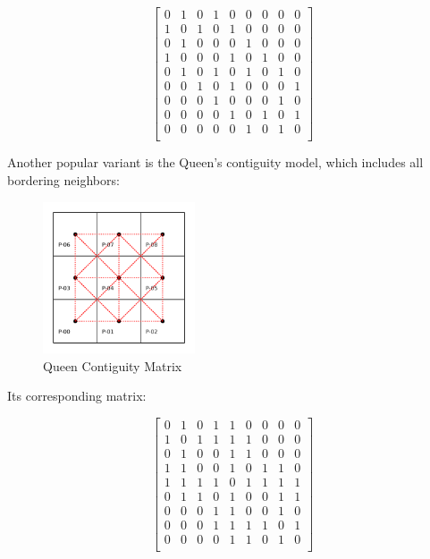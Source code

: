\documentclass{article}
\begin{document}
\[
	\begin{bmatrix}
		0 & 1 & 0 & 1 & 0 & 0 & 0 & 0 & 0 \\
		1 & 0 & 1 & 0 & 1 & 0 & 0 & 0 & 0 \\
		0 & 1 & 0 & 0 & 0 & 1 & 0 & 0 & 0 \\
		1 & 0 & 0 & 0 & 1 & 0 & 1 & 0 & 0 \\
		0 & 1 & 0 & 1 & 0 & 1 & 0 & 1 & 0 \\
		0 & 0 & 1 & 0 & 1 & 0 & 0 & 0 & 1 \\
		0 & 0 & 0 & 1 & 0 & 0 & 0 & 1 & 0 \\
		0 & 0 & 0 & 0 & 1 & 0 & 1 & 0 & 1 \\
		0 & 0 & 0 & 0 & 0 & 1 & 0 & 1 & 0 \\
	\end{bmatrix}
\]

Another popular variant is the Queen’s contiguity model, which includes all bordering neighbors:

\begin{figure}[H]
	\centering
	\includegraphics[width=0.4\textwidth]{assets/queens.png}
	\caption{Queen Contiguity Matrix}
\end{figure}

Its corresponding matrix:

\[
	\begin{bmatrix}
		0 & 1 & 0 & 1 & 1 & 0 & 0 & 0 & 0 \\
		1 & 0 & 1 & 1 & 1 & 1 & 0 & 0 & 0 \\
		0 & 1 & 0 & 0 & 1 & 1 & 0 & 0 & 0 \\
		1 & 1 & 0 & 0 & 1 & 0 & 1 & 1 & 0 \\
		1 & 1 & 1 & 1 & 0 & 1 & 1 & 1 & 1 \\
		0 & 1 & 1 & 0 & 1 & 0 & 0 & 1 & 1 \\
		0 & 0 & 0 & 1 & 1 & 0 & 0 & 1 & 0 \\
		0 & 0 & 0 & 1 & 1 & 1 & 1 & 0 & 1 \\
		0 & 0 & 0 & 0 & 1 & 1 & 0 & 1 & 0 \\
	\end{bmatrix}
\]
\end{document}
